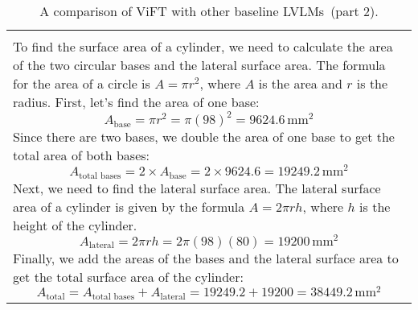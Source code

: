 \begin{table*}[htbp]
\begin{tabular}{p{14cm}}
        \begin{tcolorbox}[colback=gray!5, colframe=gray!40, sharp corners, width=\linewidth, boxrule=0.5mm]
        \small
        \textbf{InternLM-XComposer-2.5-7B:}
        \\
To find the surface area of a cylinder, we need to calculate the area of the two circular bases and the lateral surface area. The formula for the area of a circle is \( A = \pi r^2 \), where \( A \) is the area and \( r \) is the radius.
First, let's find the area of one base:
\[ A_{\text{base}} = \pi r^2 = \pi (98)^2 = 9624.6 \, \text{mm}^2 \]
Since there are two bases, we double the area of one base to get the total area of both bases:
\[ A_{\text{total bases}} = 2 \times A_{\text{base}} = 2 \times 9624.6 = 19249.2 \, \text{mm}^2 \]
Next, we need to find the lateral surface area. The lateral surface area of a cylinder is given by the formula \( A = 2\pi rh \), where \( h \) is the height of the cylinder.
\[ A_{\text{lateral}} = 2\pi rh = 2\pi (98) (80) = 19200 \, \text{mm}^2 \]
Finally, we add the areas of the bases and the lateral surface area to get the total surface area of the cylinder:
\[ A_{\text{total}} = A_{\text{total bases}} + A_{\text{lateral}} = 19249.2 + 19200 = 38449.2 \, \text{mm}^2 \]

\end{tcolorbox}

\end{tabular}
\caption{A comparison of ViFT with other baseline LVLMs~(part 2).}
\label{tab:case10}
\end{table*}



